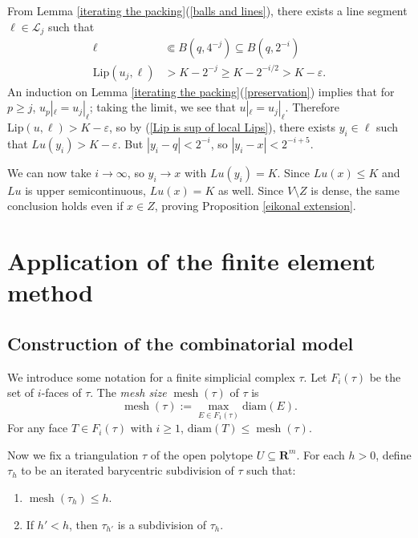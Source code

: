 \documentclass[reqno,11pt]{amsart}
\newcommand{\RR}{\mathbf{R}}
\DeclareMathOperator{\mesh}{mesh}
\newcommand{\diam}{\mathrm{diam}}
\newcommand{\Lip}{\mathrm{Lip}}
\newcommand{\dfn}[1]{\emph{#1}\index{#1}}
\theoremstyle{definition}
\numberwithin{equation}{section}
\begin{document}
From Lemma \ref{iterating the packing}(\ref{balls and lines}), there exists a line segment $\ell \in \mathscr L_j$ such that
\begin{align*}
\ell &\Subset B(q, 4^{-j}) \subseteq B(q, 2^{-i}) \\
\Lip(u_j, \ell) &> K - 2^{-j} \geq K - 2^{-i/2} > K - \varepsilon.
\end{align*}
An induction on Lemma \ref{iterating the packing}(\ref{preservation}) implies that for $p \geq j$, $u_p|_\ell = u_j|_\ell$; taking the limit, we see that $u|_\ell = u_j|_\ell$.
Therefore $\Lip(u, \ell) > K - \varepsilon$, so by (\ref{Lip is sup of local Lips}), there exists $y_i \in \ell$ such that $Lu(y_i) > K - \varepsilon$.
But $|y_i - q| < 2^{-i}$, so $|y_i - x| < 2^{-i + 5}$.

We can now take $i \to \infty$, so $y_i \to x$ with $Lu(y_i) = K$.
Since $Lu(x) \leq K$ and $Lu$ is upper semicontinuous, $Lu(x) = K$ as well.
Since $V \setminus Z$ is dense, the same conclusion holds even if $x \in Z$, proving Proposition \ref{eikonal extension}.



\section{Application of the finite element method}
\subsection{Construction of the combinatorial model}
We introduce some notation for a finite simplicial complex $\tau$.
Let $F_i(\tau)$ be the set of $i$-faces of $\tau$.
The \dfn{mesh size} $\mesh(\tau)$ of $\tau$ is 
$$\mesh(\tau) := \max_{E \in F_1(\tau)} \diam(E).$$
For any face $T \in F_i(\tau)$ with $i \geq 1$, $\diam(T) \leq \mesh(\tau)$.

Now we fix a triangulation $\tau$ of the open polytope $U \subseteq \RR^m$.
For each $h > 0$, define $\tau_h$ to be an iterated barycentric subdivision of $\tau$ such that:
\begin{enumerate}
\item $\mesh(\tau_h) \leq h$.
\item If $h' < h$, then $\tau_{h'}$ is a subdivision of $\tau_h$.
\end{enumerate}
\end{document}
